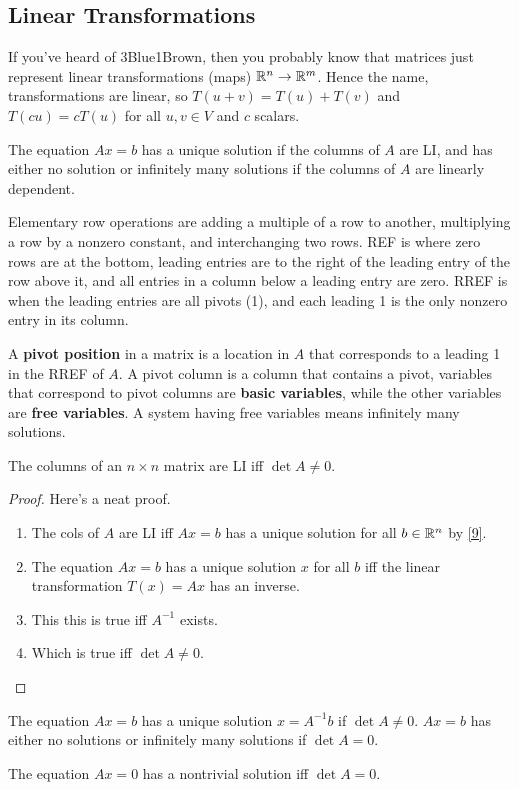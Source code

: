 \subsection{Linear Transformations}
If you've heard of 3Blue1Brown, then you probably know that matrices just represent linear transformations (maps) $\mathbb{R}^n\to \mathbb{R}^m $. Hence the name, transformations are linear, so $T(u+v)=T(u)+T(v)$ and $T(cu)=cT(u)$ for all $u,v\in V$ and $c$ scalars.
\begin{theorem}\label{9}
    The equation $Ax=b$ has a unique solution if the columns of $A$ are LI, and has either no solution or infinitely many solutions if the columns of $A$ are linearly dependent. 
\end{theorem}
Elementary row operations are adding a multiple of a row to another, multiplying a row by a nonzero constant, and interchanging two rows. REF is where zero rows are at the bottom, leading entries are to the right of the leading entry of the row above it, and all entries in a column below a leading entry are zero. RREF is when the leading entries are all pivots (1), and each leading 1 is the only nonzero entry in its column.
\begin{definition}[]
    A \textbf{pivot position} in a matrix is a location in $A$ that corresponds to a leading 1 in the RREF of $A$. A pivot column is a column that contains a pivot, variables that correspond to pivot columns are \textbf{basic variables}, while the other variables are \textbf{free variables}. A system having free variables means infinitely many solutions.
\end{definition}
\begin{lemma}
    The columns of an $n\times n$ matrix are LI iff $\det A\neq 0$.
\end{lemma}
\begin{proof}
Here's a neat proof.
\begin{enumerate}[label=(\arabic*)]
    \item The cols of $A$ are LI iff $Ax=b$ has a unique solution for all $b\in \mathbb{R}^n $ by \cref{9}.
    \item The equation $Ax=b$ has a unique solution $x$ for all $b$ iff the linear transformation $T(x)=Ax$ has an inverse.
    \item This this is true iff $A^{-1}$ exists.
    \item Which is true iff $\det A\neq 0$.
\end{enumerate}
\end{proof}
\begin{theorem}
    The equation $Ax=b$ has a unique solution $x=A^{-1}b$ if $\det A\neq 0$. $Ax=b$ has either no solutions or infinitely many solutions if $\det A=0$.
\end{theorem}
\begin{cor}
    The equation $Ax=0$ has a nontrivial solution iff $\det A=0$.
\end{cor}

